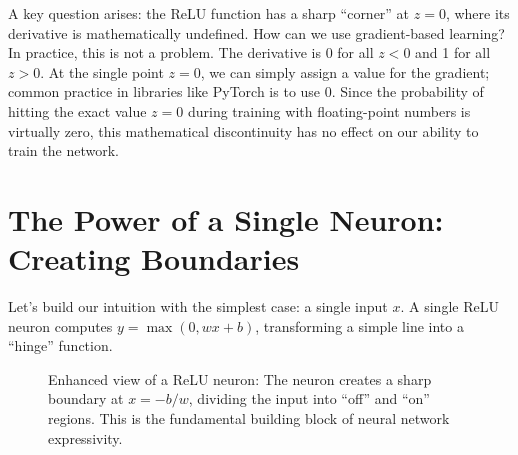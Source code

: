 \documentclass[11pt]{article}
\newcommand{\x}{\mathbf{x}}
\newcommand{\y}{\mathbf{y}}
\newcommand{\relu}{\text{ReLU}}
\begin{document}
A key question arises: the ReLU function has a sharp ``corner'' at $z=0$, where its derivative is mathematically undefined. How can we use gradient-based learning? In practice, this is not a problem. The derivative is 0 for all $z<0$ and 1 for all $z>0$. At the single point $z=0$, we can simply assign a value for the gradient; common practice in libraries like PyTorch is to use 0. Since the probability of hitting the exact value $z=0$ during training with floating-point numbers is virtually zero, this mathematical discontinuity has no effect on our ability to train the network.

\section{The Power of a Single Neuron: Creating Boundaries}
Let's build our intuition with the simplest case: a single input $x$. A single ReLU neuron computes $y = \max(0, wx+b)$, transforming a simple line into a ``hinge'' function.

\begin{figure}[h!]
\centering
{}
\caption{Enhanced view of a ReLU neuron: The neuron creates a sharp boundary at $x = -b/w$, dividing the input into ``off'' and ``on'' regions. This is the fundamental building block of neural network expressivity.}
\label{fig:relu_hinge}
\end{figure}
\end{document}

